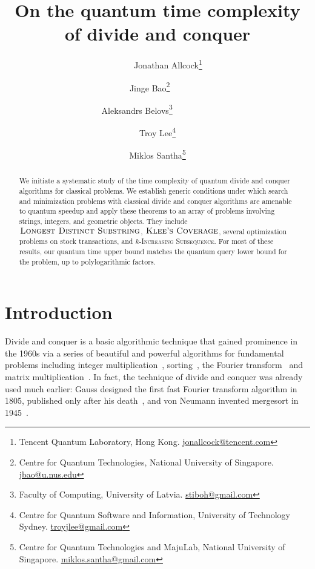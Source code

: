 \documentclass[12pt]{article}
\newcommand{\ISf}{\textsc{Increasing Subsequence}}
\newcommand{\ldsf}{\textsc{Longest Distinct Substring}}
\newcommand{\KCf}{\textsc{Klee's Coverage}}
\theoremstyle{definition}
\begin{document}
\title{On the quantum time complexity of divide and conquer}
\author{
  ~~~~~~~~
  Jonathan Allcock\thanks{Tencent Quantum Laboratory, Hong Kong. \url{jonallcock@tencent.com}} ~~~ \and
  Jinge Bao\thanks{Centre for Quantum Technologies, National University of Singapore. \url{jbao@u.nus.edu}} ~~~ \and
  Aleksandrs Belovs\thanks{Faculty of Computing, University of Latvia. \url{stiboh@gmail.com}} ~~~~~~~~ \and
  Troy Lee\thanks{Centre for Quantum Software and Information, University of Technology Sydney. \url{troyjlee@gmail.com}} \and
  Miklos Santha\thanks{Centre for Quantum Technologies and MajuLab, National University of Singapore. \url{miklos.santha@gmail.com}}
}

\date{}
\maketitle

\begin{abstract}
We initiate a systematic study of the time complexity of quantum divide and conquer algorithms for classical problems.
We establish generic conditions under which search and minimization problems with classical divide and conquer algorithms are amenable to quantum speedup and apply these theorems to an array of problems involving strings, integers, and geometric objects. They include $\ldsf$, $\KCf$, several optimization problems on stock transactions, and $k$-\ISf.
For most of these results, our quantum time upper bound matches the quantum query lower bound for the problem, up to polylogarithmic factors.
\end{abstract}


\section{Introduction}
\label{sec:intro}
Divide and conquer is a basic algorithmic technique that gained prominence in the 1960s via a series of beautiful and powerful algorithms for fundamental problems including integer multiplication~\cite{KO62}, sorting~\cite{Hoa62}, the Fourier transform~\cite{CT65} and matrix multiplication~\cite{Str69}. In fact, the technique of divide and conquer was already used much earlier: Gauss designed the first fast Fourier transform algorithm in 1805, published only after his death~\cite{G1876, HJB84}, and von Neumann invented mergesort in 1945~\cite{GN47}.
\end{document}
